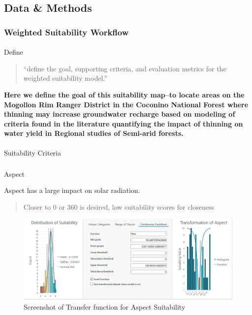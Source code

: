 \documentclass[
  number]{elsarticle}
\makeatletter
\let\oldparagraph\paragraph
\renewcommand{\paragraph}{
    \@ifstar
      \xxxParagraphStar
      \xxxParagraphNoStar
  }
\newcommand{\xxxParagraphStar}[1]{\oldparagraph*{#1}\mbox{}}
\newcommand{\xxxParagraphNoStar}[1]{\oldparagraph{#1}\mbox{}}
\let\oldsubparagraph\subparagraph
\renewcommand{\subparagraph}{
    \@ifstar
      \xxxSubParagraphStar
      \xxxSubParagraphNoStar
  }
\newcommand{\xxxSubParagraphStar}[1]{\oldsubparagraph*{#1}\mbox{}}
\newcommand{\xxxSubParagraphNoStar}[1]{\oldsubparagraph{#1}\mbox{}}
\makeatother
\begin{document}
\subsection{Data \& Methods}\label{sec-data-methods}

\subsubsection{Weighted Suitability
Workflow}\label{weighted-suitability-workflow}

\paragraph{Define}\label{define}

\begin{quote}
``define the goal, supporting criteria, and evaluation metrics for the
weighted suitability model.''
\end{quote}

\textbf{Here we define the goal of this suitability map--to locate areas
on the Mogollon Rim Ranger District in the Coconino National Forest
where thinning may increase groundwater recharge based on modeling of
criteria found in the literature quantifying the impact of thinning on
water yield in Regional studies of Semi-arid forests.}

\paragraph{Suitability Criteria}\label{suitability-criteria}

\subparagraph{Aspect}\label{aspect}

Aspect has a large impact on solar radiation.

\begin{quote}
Closer to 0 or 360 is desired, low suitability scores for closeness
\end{quote}

\begin{figure}[H]

{\centering \includegraphics{images/Aspect_suitability.PNG}

}

\caption{Screenshot of Transfer function for Aspect Suitability}

\end{figure}%
\end{document}
